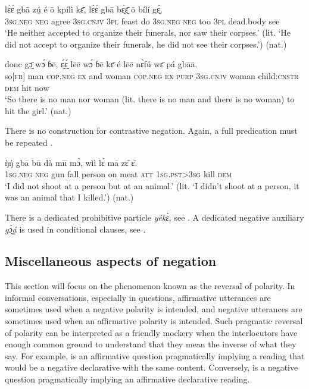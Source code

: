 \documentclass[output=paper,colorlinks,citecolor=brown]{langscibook}
\begin{document}
\ea\label{ex:mano:83}
    \gll lɛ̀ɛ́ gbā zṵ́ é ō kpílì kɛ̄, lɛ̀ɛ́ gbā bɛ̰̀ɛ̰̄ ō bílí gɛ̰̀. \\
         3\textsc{sg.neg} \textsc{neg} agree 3\textsc{sg.cnjv} \textsc{3pl} feast do \textsc{3sg.neg} \textsc{neg} too \textsc{3pl} dead.body see  \\
    \glt ‘He neither accepted to organize their funerals, nor saw their corpses.’ (lit. ‘He did not accept to organize their funerals, he did not see their corpses.’) (nat.)
\z

\ea\label{ex:mano:84}
    \gll donc gɔ̰̄ wɔ́ ɓē, ɛ̰́ɛ̰́ lēē wɔ́ ɓē kɛ̄ é lēē nɛ̀fú wɛ̄ pá gbāā. \\
     so[\textsc{fr}] man \textsc{cop.neg} \textsc{ex} and woman \textsc{cop.neg} \textsc{ex} \textsc{purp} 3\textsc{sg.cnjv} woman child:\textsc{cnstr} \textsc{dem} hit now \\
    \glt ‘So there is no man nor woman (lit. there is no man and there is no woman) to hit the girl.’ (nat.)
\z

There is no construction for contrastive negation. Again, a full predication must be repeated .

\ea\label{ex:mano:85}
    \gll ŋ̀ŋ́ gbā bū dà mīī mɔ̀, wìì lɛ́ mā zɛ̄ ɛ̄.   \\
         1\textsc{sg.neg} \textsc{neg} gun fall person on meat  \textsc{att} \textsc{1sg.pst>3sg} kill \textsc{dem}   \\
    \glt ‘I did not shoot at a person but at an animal.’ (lit. ‘I didn't shoot at a person, it was an animal that I killed.’) (nat.)
\z

There is a dedicated prohibitive particle \textit{yékɛ̀}, see . A dedicated negative auxiliary \textit{gɔ̰̀á̰̰} is used in conditional clauses, see .

\subsection{Miscellaneous aspects of negation}\label{sec:mano:4.6}
This section will focus on the phenomenon known as the reversal of polarity.
In informal conversations, especially in questions, affirmative utterances are sometimes used when a negative polarity is intended, and negative utterances are sometimes used when an affirmative polarity is intended. Such pragmatic reversal of polarity can be interpreted as a friendly mockery when the interlocutors have enough common ground to understand that they mean the inverse of what they say. For example,  is an affirmative question pragmatically implying a reading that would be a negative declarative with the same content. Conversely,  is a negative question pragmatically implying an affirmative declarative reading.
\end{document}
